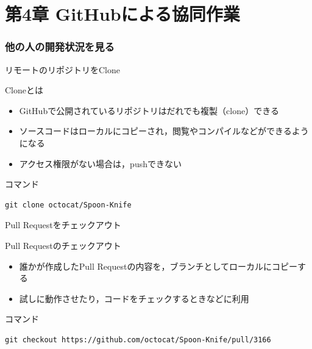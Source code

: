 \documentclass[t, aspectratio=169]{beamer}
\begin{document}
\part{第4章 GitHubによる協同作業}
\label{sec-4}
\section{他の人の開発状況を見る}
\label{sec-4-1}
\begin{frame}[fragile,label=sec-4-1-1]{リモートのリポジトリをClone}
 \begin{block}{Cloneとは}
\begin{itemize}
\item GitHubで公開されているリポジトリはだれでも複製（clone）できる
\item ソースコードはローカルにコピーされ，閲覧やコンパイルなどができるようになる
\item アクセス権限がない場合は，pushできない
\end{itemize}
\end{block}

\begin{block}{コマンド}
\begin{verbatim}
git clone octocat/Spoon-Knife
\end{verbatim}
\end{block}
\end{frame}
\begin{frame}[fragile,label=sec-4-1-2]{Pull Requestをチェックアウト}
 \begin{block}{Pull Requestのチェックアウト}
\begin{itemize}
\item 誰かが作成したPull Requestの内容を，ブランチとしてローカルにコピーする
\item 試しに動作させたり，コードをチェックするときなどに利用
\end{itemize}
\end{block}

\begin{block}{コマンド}
\begin{verbatim}
git checkout https://github.com/octocat/Spoon-Knife/pull/3166
\end{verbatim}
\end{block}
\end{frame}
\end{document}
